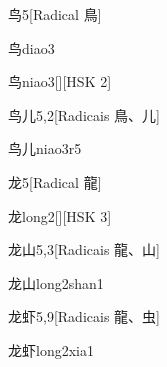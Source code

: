 \begin{entry}{鸟}{5}[Radical ⿃]
  \begin{phonetics}{鸟}{diao3}
  \end{phonetics}
  \begin{phonetics}{鸟}{niao3}[][HSK 2]
  \end{phonetics}
\end{entry}

\begin{entry}{鸟儿}{5,2}[Radicais ⿃、⼉]
  \begin{phonetics}{鸟儿}{niao3r5}
  \end{phonetics}
\end{entry}

\begin{entry}{龙}{5}[Radical ⿓]
  \begin{phonetics}{龙}{long2}[][HSK 3]
  \end{phonetics}
\end{entry}

\begin{entry}{龙山}{5,3}[Radicais ⿓、⼭]
  \begin{phonetics}{龙山}{long2shan1}
  \end{phonetics}
\end{entry}

\begin{entry}{龙虾}{5,9}[Radicais ⿓、⾍]
  \begin{phonetics}{龙虾}{long2xia1}
  \end{phonetics}
\end{entry}


